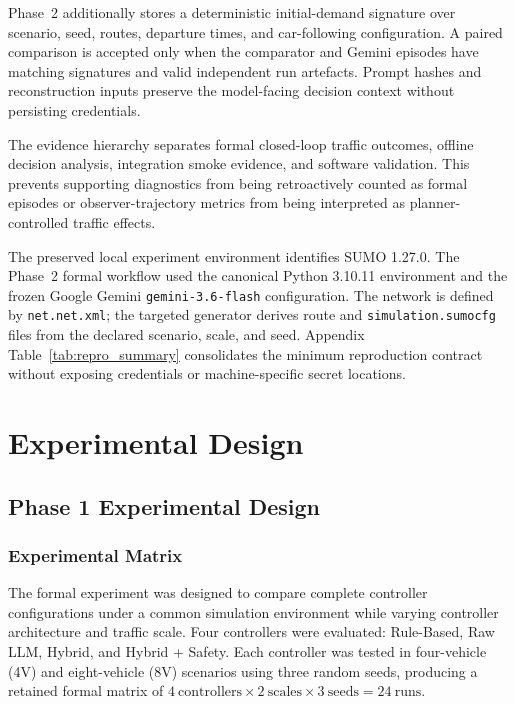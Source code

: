 \documentclass[letterpaper,10pt,conference]{ieeeconf}
\begin{document}
Phase~2 additionally stores a deterministic initial-demand signature over scenario, seed, routes, departure times, and car-following configuration. A paired comparison is accepted only when the comparator and Gemini episodes have matching signatures and valid independent run artefacts. Prompt hashes and reconstruction inputs preserve the model-facing decision context without persisting credentials.



The evidence hierarchy separates formal closed-loop traffic outcomes, offline decision analysis, integration smoke evidence, and software validation. This prevents supporting diagnostics from being retroactively counted as formal episodes or observer-trajectory metrics from being interpreted as planner-controlled traffic effects.



The preserved local experiment environment identifies SUMO 1.27.0. The Phase~2 formal workflow used the canonical Python 3.10.11 environment and the frozen Google Gemini \texttt{gemini-3.6-flash} configuration. The network is defined by \texttt{net.net.xml}; the targeted generator derives route and \texttt{simulation.sumocfg} files from the declared scenario, scale, and seed. Appendix Table~\ref{tab:repro_summary} consolidates the minimum reproduction contract without exposing credentials or machine-specific secret locations.



\section{Experimental Design}

\label{sec:experimental_design}



\subsection{Phase 1 Experimental Design}



\subsubsection{Experimental Matrix}



The formal experiment was designed to compare complete controller configurations under a common simulation environment while varying controller architecture and traffic scale. Four controllers were evaluated: Rule-Based, Raw LLM, Hybrid, and Hybrid + Safety. Each controller was tested in four-vehicle (4V) and eight-vehicle (8V) scenarios using three random seeds, producing a retained formal matrix of \(4\ \text{controllers} \times 2\ \text{scales} \times 3\ \text{seeds} = 24\ \text{runs}\).
\end{document}
